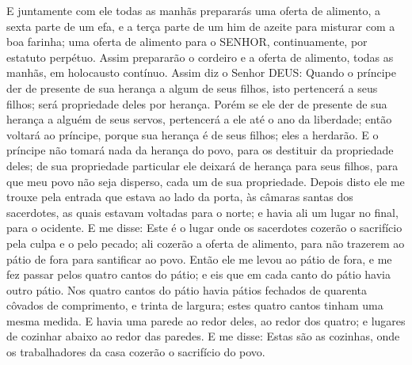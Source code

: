 {  E juntamente com ele todas as manhãs prepararás uma oferta de alimento, a sexta parte de um efa, e a terça parte de um him de azeite para misturar com a boa farinha;
{} uma oferta de alimento para o SENHOR, continuamente, por estatuto perpétuo.
  Assim prepararão o cordeiro e a oferta de alimento, todas as manhãs, em holocausto contínuo.
  Assim diz o Senhor DEUS: Quando o príncipe der de presente
{} de sua herança a algum de seus filhos, isto pertencerá a seus filhos; será propriedade deles por herança.
  Porém se ele der de presente
{} de sua herança a alguém de seus servos, pertencerá a ele até o ano da liberdade;
 então voltará ao príncipe, porque sua herança é de seus filhos; eles a herdarão.
  E o príncipe não tomará nada da herança do povo, para os destituir da propriedade deles; de sua propriedade particular ele deixará de herança para seus filhos, para que meu povo não seja disperso, cada um de sua propriedade.
  Depois disto ele me trouxe pela entrada que estava ao lado da porta, às câmaras santas dos sacerdotes, as quais estavam voltadas para o norte; e havia ali um lugar no final, para o ocidente.
  E me disse: Este é o lugar onde os sacerdotes cozerão o sacrifício pela culpa e o pelo pecado; ali cozerão a oferta de alimento, para não
{} trazerem ao pátio de fora para santificar ao povo.
  Então ele me levou ao pátio de fora, e me fez passar pelos quatro cantos do pátio; e eis que em cada canto do pátio havia outro pátio.
  Nos quatro cantos do pátio havia
{} pátios fechados
 de quarenta côvados de comprimento, e trinta de largura; estes quatro cantos tinham uma mesma medida.
  E havia uma parede ao redor deles, ao redor dos quatro; e lugares de cozinhar abaixo ao redor das paredes.
  E me disse: Estas são as cozinhas, onde os trabalhadores da casa cozerão o sacrifício do povo.
\par }

